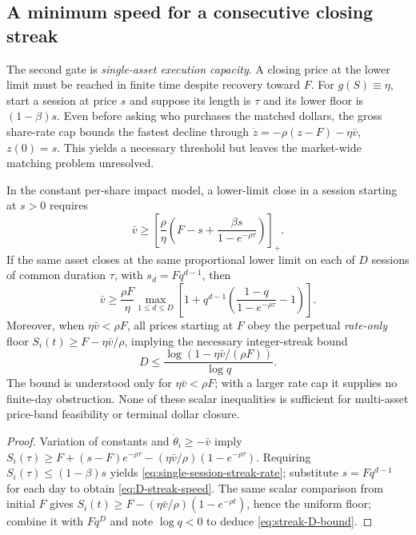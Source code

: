 \documentclass[review,hidelinks,onefignum,onetabnum]{siamonline250211}
\begin{document}
\subsection{A minimum speed for a consecutive closing streak}\label{subsec:multiday-rate}
The second gate is \emph{single-asset execution capacity}. A closing price at the lower limit must be reached in finite time despite recovery toward $F$. For $g(S)\equiv\eta$, start a session at price $s$ and suppose its length is $\tau$ and its lower floor is $(1-\beta)s$. Even before asking who purchases the matched dollars, the gross share-rate cap bounds the fastest decline through $\dot z=-\rho(z-F)-\eta\bar v$, $z(0)=s$. This yields a necessary threshold but leaves the market-wide matching problem unresolved.
\begin{proposition}\label{prop:rolling-rate}
In the constant per-share impact model, a lower-limit close in a session starting at $s>0$ requires
\begin{equation}\label{eq:single-session-streak-rate}
 \boxed{\quad\bar v\ge \left[\frac{\rho}{\eta}\left(F-s+
 \frac{\beta s}{1-e^{-\rho\tau}}\right)\right]_+.\quad}
\end{equation}
If the same asset closes at the same proportional lower limit on each of $D$ sessions of common duration $\tau$, with $s_d=Fq^{d-1}$, then
\begin{equation}\label{eq:D-streak-speed}
\boxed{\quad\bar v\ge\frac{\rho F}{\eta}\max_{1\le d\le D}
 \left[1+q^{d-1}\left(\frac{1-q}{1-e^{-\rho\tau}}-1\right)\right].\quad}
\end{equation}
Moreover, when $\eta\bar v<\rho F$, all prices starting at $F$ obey the perpetual \emph{rate-only} floor $S_i(t)\ge F-\eta\bar v/\rho$, implying the necessary integer-streak bound
\begin{equation}\label{eq:streak-D-bound}
\boxed{\quad D\le\frac{\log(1-\eta\bar v/(\rho F))}{\log q}.\quad}
\end{equation}
The bound is understood only for $\eta\bar v<\rho F$; with a larger rate cap it supplies no finite-day obstruction. None of these scalar inequalities is sufficient for multi-asset price-band feasibility or terminal dollar closure.
\end{proposition}
\begin{proof}
Variation of constants and $\dot\theta_i\ge-\bar v$ imply
$S_i(\tau)\ge F+(s-F)e^{-\rho\tau}-(\eta\bar v/\rho)(1-e^{-\rho\tau})$.
Requiring $S_i(\tau)\le(1-\beta)s$ yields \eqref{eq:single-session-streak-rate}; substitute $s=Fq^{d-1}$ for each day to obtain \eqref{eq:D-streak-speed}. The same scalar comparison from initial $F$ gives $S_i(t)\ge F-(\eta\bar v/\rho)(1-e^{-\rho t})$, hence the uniform floor; combine it with $Fq^D$ and note $\log q<0$ to deduce \eqref{eq:streak-D-bound}.
\end{proof}
\end{document}
